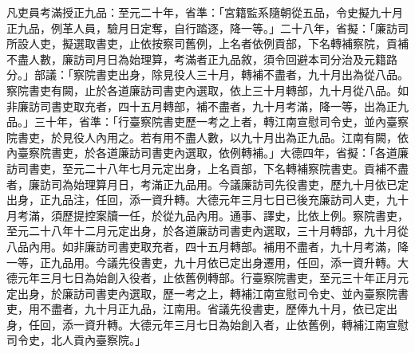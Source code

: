 \begin{pinyinscope}
 凡吏員考滿授正九品：至元二十年，省準：「宮籍監系隨朝從五品，令史擬九十月正九品，例革人員，驗月日定奪，自行踏逐，降一等。」二十八年，省擬：「廉訪司所設人吏，擬選取書吏，止依按察司舊例，上名者依例貢部，下名轉補察院，貢補不盡人數，廉訪司月日為始理算，考滿者正九品敘，須令回避本司分治及元籍路分。」部議：「察院書吏出身，除見役人三十月，轉補不盡者，九十月出為從八品。察院書吏有闕，止於各道廉訪司書吏內選取，依上三十月轉部，九十月從八品。如非廉訪司書吏取充者，四十五月轉部，補不盡者，九十月考滿，降一等，出為正九品。」三十年，省準：「行臺察院書吏歷一考之上者，轉江南宣慰司令史，並內臺察院書吏，於見役人內用之。若有用不盡人數，以九十月出為正九品。江南有闕，依內臺察院書吏，於各道廉訪司書吏內選取，依例轉補。」大德四年，省擬：「各道廉訪司書吏，至元二十八年七月元定出身，上名貢部，下名轉補察院書吏。貢補不盡者，廉訪司為始理算月日，考滿正九品用。今議廉訪司先役書吏，歷九十月依已定出身，正九品注，任回，添一資升轉。大德元年三月七日已後充廉訪司人吏，九十月考滿，須歷提控案牘一任，於從九品內用。通事、譯史，比依上例。察院書吏，至元二十八年十二月元定出身，於各道廉訪司書吏內選取，三十月轉部，九十月從八品內用。如非廉訪司書吏取充者，四十五月轉部。補用不盡者，九十月考滿，降一等，正九品用。今議先役書吏，九十月依已定出身遷用，任回，添一資升轉。大德元年三月七日為始創入役者，止依舊例轉部。行臺察院書吏，至元三十年正月元定出身，於廉訪司書吏內選取，歷一考之上，轉補江南宣慰司令史、並內臺察院書吏，用不盡者，九十月正九品，江南用。省議先役書吏，歷俸九十月，依已定出身，任回，添一資升轉。大德元年三月七日為始創入者，止依舊例，轉補江南宣慰司令史，北人貢內臺察院。」




\end{pinyinscope}
